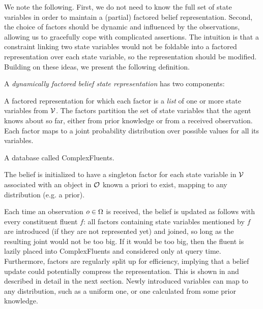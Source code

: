 We note the following. First, we do not need to know the full set of
state variables in order to maintain a (partial) factored belief
representation. Second, the choice of factors should be dynamic and
influenced by the observations, allowing us to gracefully cope with
complicated assertions. The intuition is that a constraint linking two
state variables would not be foldable into a factored representation
over each state variable, so the representation should be
modified. Building on these ideas, we present the following
definition.

\begin{defn}
  A \emph{dynamically factored belief state representation} has two components:
  \begin{tightlist}
  \item A factored representation for which each factor is a
    \emph{list} of one or more state variables from $\mathcal{V}$. The factors
    partition the set of state variables that the agent knows about so
    far, either from prior knowledge or from a received
    observation. Each factor maps to a joint probability distribution
    over possible values for all its variables.
  \item A database called ComplexFluents.
  \end{tightlist}
\end{defn}

The belief is initialized to have a singleton factor for each state
variable in $\mathcal{V}$ associated with an object in $\mathcal{O}$ known a priori to
exist, mapping to any distribution (e.g. a prior).

Each time an observation $o \in \Omega$ is received, the belief is
updated as follows with every constituent fluent $f$: all factors
containing state variables mentioned by $f$ are introduced (if they
are not represented yet) and joined, so long as the resulting joint
would not be too big. If it would be too big, then the fluent is
lazily placed into ComplexFluents and considered only at query
time. Furthermore, factors are regularly split up for efficiency,
implying that a belief update could potentially compress the
representation. This is shown in  and
described in detail in the next section. Newly introduced variables
can map to any distribution, such as a uniform one, or one calculated
from some prior knowledge.

